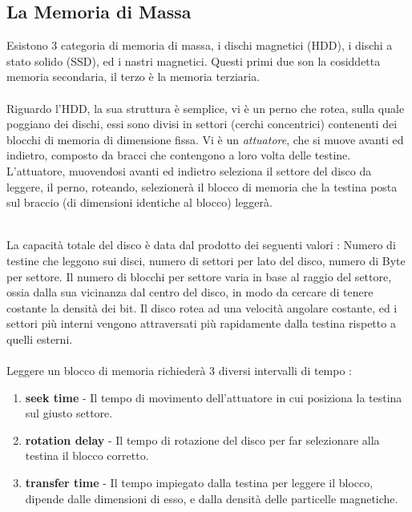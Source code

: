 \documentclass[12pt, letterpaper]{article}
\newcommand{\acc}{\\\hphantom{}\\}
\begin{document}
\subsection{La Memoria di Massa}
Esistono 3 categoria di memoria di massa, i dischi magnetici (HDD), i dischi a stato solido (SSD), ed i nastri magnetici. 
Questi primi due son la cosiddetta memoria secondaria, il terzo è la memoria terziaria.\acc

Riguardo l'HDD, la sua struttura è semplice, vi è un perno che rotea, sulla quale poggiano dei dischi, essi sono divisi in settori (cerchi 
concentrici) contenenti dei blocchi di memoria di dimensione fissa. Vi è un \textit{attuatore}, che si muove avanti ed indietro, 
composto da bracci che contengono a loro volta delle testine. L'attuatore, muovendosi avanti ed indietro seleziona il settore del 
disco da leggere, il perno, roteando, selezionerà il blocco di memoria che la testina posta sul braccio (di dimensioni 
identiche al blocco) leggerà.
\begin{figure}[h]
\end{figure}\\
La capacità totale del disco è data dal prodotto dei seguenti valori : Numero di testine che leggono sui disci, 
numero di settori per lato del disco, numero di Byte per settore. Il numero di blocchi per settore varia in base al 
raggio del settore, ossia dalla sua vicinanza dal centro del disco, in modo da cercare di tenere costante la 
densità dei bit. Il disco rotea ad una velocità angolare costante, ed i settori più interni vengono attraversati 
più rapidamente dalla testina rispetto a quelli esterni.\acc Leggere un blocco di memoria richiederà 3 diversi intervalli di tempo :\begin{enumerate}
    \item \textbf{seek time }- Il tempo di movimento dell'attuatore in cui posiziona la testina sul giusto settore.
    \item \textbf{rotation delay} - Il tempo di rotazione del disco per far selezionare alla testina il blocco corretto.
    \item \textbf{transfer time} - Il tempo impiegato dalla testina per leggere il blocco, dipende dalle dimensioni di esso, 
    e dalla densità delle particelle magnetiche.
\end{enumerate}
\end{document}
